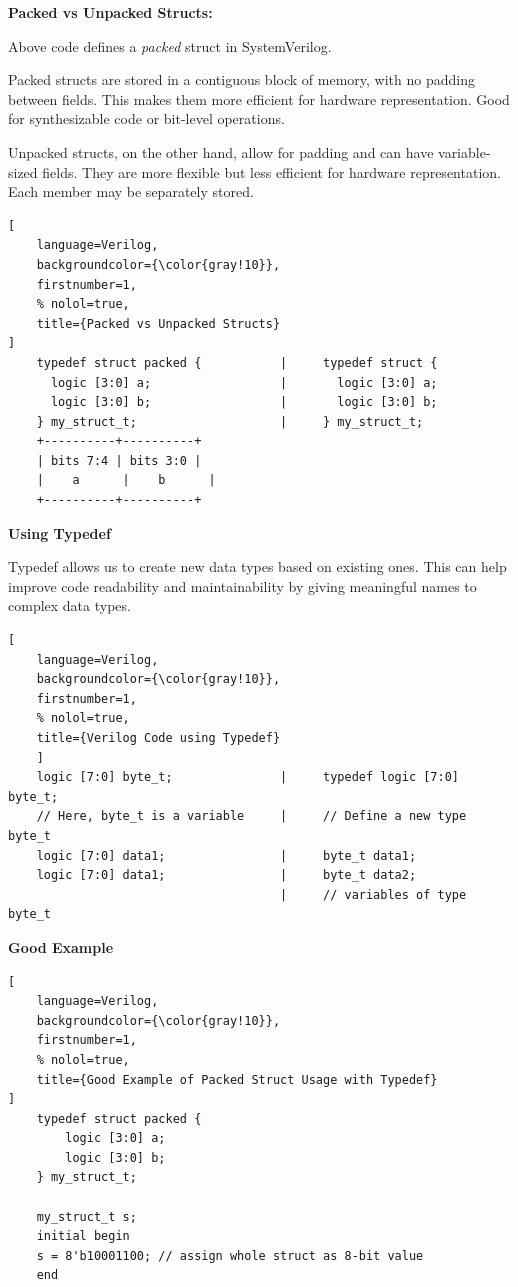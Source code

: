 \documentclass[12pt, a4paper]{article}
\begin{document}
\textbf{Packed vs Unpacked Structs:}

Above code defines a \textit{packed} struct in SystemVerilog. 

Packed structs are stored in a contiguous block of memory, with no padding between fields. This makes them more efficient for hardware representation. Good for synthesizable code or bit-level operations.

\vspace{1em}

Unpacked structs, on the other hand, allow for padding and can have variable-sized fields. They are more flexible but less efficient for hardware representation. Each member may be separately stored.

\begin{lstlisting}[
    language=Verilog,
    backgroundcolor={\color{gray!10}},
    firstnumber=1,
    % nolol=true,
    title={Packed vs Unpacked Structs}
]
    typedef struct packed {           |     typedef struct {
      logic [3:0] a;                  |       logic [3:0] a;
      logic [3:0] b;                  |       logic [3:0] b;
    } my_struct_t;                    |     } my_struct_t;
    +----------+----------+
    | bits 7:4 | bits 3:0 |
    |    a      |    b      |
    +----------+----------+
\end{lstlisting}

\vspace{1em}

\textbf{Using Typedef}

Typedef allows us to create new data types based on existing ones. This can help improve code readability and maintainability by giving meaningful names to complex data types.


\begin{lstlisting}[
    language=Verilog,
    backgroundcolor={\color{gray!10}},
    firstnumber=1,
    % nolol=true,
    title={Verilog Code using Typedef}
    ]
    logic [7:0] byte_t;               |     typedef logic [7:0] byte_t;  
    // Here, byte_t is a variable     |     // Define a new type byte_t
    logic [7:0] data1;                |     byte_t data1;     
    logic [7:0] data1;                |     byte_t data2;   
                                      |     // variables of type byte_t
\end{lstlisting}


\textbf{Good Example}

\begin{lstlisting}[
    language=Verilog,
    backgroundcolor={\color{gray!10}},
    firstnumber=1,
    % nolol=true,
    title={Good Example of Packed Struct Usage with Typedef}
]
    typedef struct packed {
        logic [3:0] a;
        logic [3:0] b;
    } my_struct_t;

    my_struct_t s;
    initial begin
    s = 8'b10001100; // assign whole struct as 8-bit value
    end
\end{lstlisting}
\end{document}
